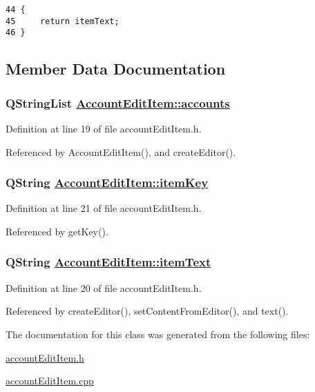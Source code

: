 \footnotesize\begin{verbatim}44 {
45     return itemText;
46 }
\end{verbatim}\normalsize 




\subsection{Member Data Documentation}
\hypertarget{classAccountEditItem_r0}{
\subsubsection[accounts]{\setlength{\rightskip}{0pt plus 5cm}QString\-List \hyperlink{classAccountEditItem_r0}{Account\-Edit\-Item::accounts}}}
\label{classAccountEditItem_r0}


Definition at line 19 of file account\-Edit\-Item.h.

Referenced by Account\-Edit\-Item(), and create\-Editor().\hypertarget{classAccountEditItem_r2}{
\subsubsection[itemKey]{\setlength{\rightskip}{0pt plus 5cm}QString \hyperlink{classAccountEditItem_r2}{Account\-Edit\-Item::item\-Key}}}
\label{classAccountEditItem_r2}


Definition at line 21 of file account\-Edit\-Item.h.

Referenced by get\-Key().\hypertarget{classAccountEditItem_r1}{
\subsubsection[itemText]{\setlength{\rightskip}{0pt plus 5cm}QString \hyperlink{classAccountEditItem_r1}{Account\-Edit\-Item::item\-Text}}}
\label{classAccountEditItem_r1}


Definition at line 20 of file account\-Edit\-Item.h.

Referenced by create\-Editor(), set\-Content\-From\-Editor(), and text().

The documentation for this class was generated from the following files:\begin{CompactItemize}
\item 
\hyperlink{accountEditItem_8h}{account\-Edit\-Item.h}\item 
\hyperlink{accountEditItem_8cpp}{account\-Edit\-Item.cpp}\end{CompactItemize}
